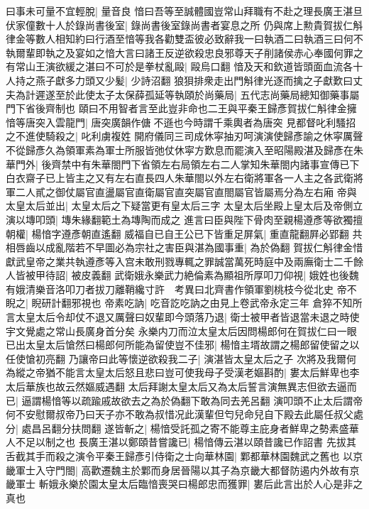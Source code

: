 曰事未可量不宜輕脫|{
	量音良}
愔曰吾等至誠體國豈常山拜職有不赴之理長廣王湛旦伏家僮數十人於錄尚書後室|{
	錄尚書後室錄尚書者宴息之所}
仍與席上勲貴賀拔仁斛律金等數人相知約曰行酒至愔等我各勸雙盃彼必致辭我一曰執酒二曰執酒三曰何不執爾輩即執之及宴如之愔大言曰諸王反逆欲殺忠良邪尊天子削諸侯赤心奉國何罪之有常山王演欲緩之湛曰不可於是拳杖亂毆|{
	毆烏口翻}
愔及天和欽道皆頭面血流各十人持之燕子獻多力頭又少髪|{
	少詩沼翻}
狼狽排衆走出門斛律光逐而擒之子獻歎曰丈夫為計遲遂至於此使太子太保薛孤延等執頤於尚藥局|{
	五代志尚藥局總知御藥事屬門下省後齊制也}
頤曰不用智者言至此豈非命也二王與平秦王歸彥賀拔仁斛律金擁愔等唐突入雲龍門|{
	唐突廣韻作傏不遜也今時謂千乘輿者為唐突}
見都督叱利騷招之不進使騎殺之|{
	叱利虜複姓}
開府儀同三司成休寜抽刃呵演演使歸彥諭之休寜厲聲不從歸彥久為領軍素為軍士所服皆弛仗休寜方歎息而罷演入至昭陽殿湛及歸彥在朱華門外|{
	後齊禁中有朱華閤門下省領左右局領左右二人掌知朱華閤内諸事宣傳已下白衣齋子已上皆主之又有左右直長四人朱華閤以外左右衛將軍各一人主之各武衛將軍二人貳之御仗屬官直盪屬官直衛屬官直突屬官直閤屬官皆屬焉分為左右廂}
帝與太皇太后並出|{
	太皇太后之下疑當更有皇太后三字}
太皇太后坐殿上皇太后及帝側立演以塼叩頭|{
	塼朱緣翻範土為塼陶而成之}
進言曰臣與陛下骨肉至親楊遵彥等欲獨擅朝權|{
	楊愔字遵彥朝直遙翻}
威福自已自王公已下皆重足屏氣|{
	重直龍翻屛必郢翻}
共相唇齒以成亂階若不早圖必為宗社之害臣與湛為國事重|{
	為於偽翻}
賀拔仁斛律金惜獻武皇帝之業共執遵彥等入宫未敢刑戮專輒之罪誠當萬死時庭中及兩廡衛士二千餘人皆被甲待詔|{
	被皮義翻}
武衛娥永樂武力絶倫素為顯祖所厚叩刀仰視|{
	娥姓也後魏有娥清樂音洛叩刀者拔刀離鞘纔寸許　考異曰北齊書作領軍劉桃枝今從北史}
帝不睨之|{
	睨研計翻邪視也}
帝素吃訥|{
	吃音訖吃訥之由見上卷武帝永定三年}
倉猝不知所言太皇太后令却仗不退又厲聲曰奴輩即今頭落乃退|{
	衛士被甲者皆退當未退之時使宇文覺處之常山長廣身首分矣}
永樂内刀而泣太皇太后因問楊郎何在賀拔仁曰一眼已出太皇太后愴然曰楊郎何所能為留使豈不佳邪|{
	楊愔主壻故謂之楊郎留使留之以任使愴初亮翻}
乃讓帝曰此等懷逆欲殺我二子|{
	演湛皆太皇太后之子}
次將及我爾何為縱之帝猶不能言太皇太后怒且悲曰豈可使我母子受漢老嫗斟酌|{
	婁太后鮮卑也李太后華族也故云然嫗威遇翻}
太后拜謝太皇太后又為太后誓言演無異志但欲去逼而已|{
	逼謂楊愔等以疏踰戚故欲去之為於偽翻下敢為同去羌呂翻}
演叩頭不止太后謂帝何不安慰爾叔帝乃曰天子亦不敢為叔惜况此漢輩但匄兒命兒自下殿去此屬任叔父處分|{
	處昌呂翻分扶問翻}
遂皆斬之|{
	楊愔受託孤之寄不能尊主庇身者鮮卑之勢素盛華人不足以制之也}
長廣王湛以鄭頤昔嘗讒已|{
	楊愔傳云湛以頤昔讒已作詔書}
先拔其舌截其手而殺之演令平秦王歸彥引侍衛之士向華林園|{
	鄴都華林園魏武之舊也}
以京畿軍士入守門閤|{
	高歡遷魏主於鄴而身居晉陽以其子為京畿大都督防遏内外故有京畿軍士}
斬娥永樂於園太皇太后臨愔喪哭曰楊郎忠而獲罪|{
	婁后此言出於人心是非之真也}

